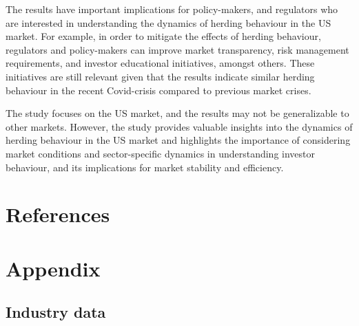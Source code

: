 \documentclass[
  letterpaper,
  DIV=11,
  numbers=noendperiod]{scrartcl}
\begin{document}
The results have important implications for policy-makers, and
regulators who are interested in understanding the dynamics of herding
behaviour in the US market. For example, in order to mitigate the
effects of herding behaviour, regulators and policy-makers can improve
market transparency, risk management requirements, and investor
educational initiatives, amongst others. These initiatives are still
relevant given that the results indicate similar herding behaviour in
the recent Covid-crisis compared to previous market crises.

The study focuses on the US market, and the results may not be
generalizable to other markets. However, the study provides valuable
insights into the dynamics of herding behaviour in the US market and
highlights the importance of considering market conditions and
sector-specific dynamics in understanding investor behaviour, and its
implications for market stability and efficiency.

\newpage

\section*{References}\label{references}

\renewcommand{\bibsection}{}


\setcounter{section}{0}
\renewcommand{\thesection}{\Alph{section}}

\setcounter{table}{0}
\renewcommand{\thetable}{A\arabic{table}}

\setcounter{figure}{0}
\renewcommand{\thefigure}{A\arabic{figure}}

\newpage

\section{Appendix}\label{appendix}

\subsection{Industry data}\label{industry-data}
\end{document}
